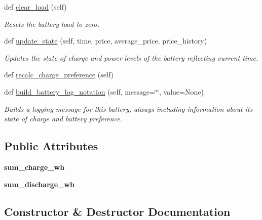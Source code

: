 \begin{DoxyCompactItemize}
def \hyperlink{class_build_1_1_objects_1_1battery_1_1_battery_a1820a5bff8f3d5d46f8d32ff73e1006c}{clear\+\_\+load} (self)
\begin{DoxyCompactList}\small\item\em Resets the battery load to zero. \end{DoxyCompactList}\item 
def \hyperlink{class_build_1_1_objects_1_1battery_1_1_battery_a246d8921279b7cb78a0f6b33f2309085}{update\+\_\+state} (self, time, price, average\+\_\+price, price\+\_\+history)
\begin{DoxyCompactList}\small\item\em Updates the state of charge and power levels of the battery reflecting current time. \end{DoxyCompactList}\item 
def \hyperlink{class_build_1_1_objects_1_1battery_1_1_battery_a2c343f81c849a4b8d6de5de9f19ebc98}{recalc\+\_\+charge\+\_\+preference} (self)
\item 
def \hyperlink{class_build_1_1_objects_1_1battery_1_1_battery_aa4838ab445d5c20f9c27752ffc911c6e}{build\+\_\+battery\+\_\+log\+\_\+notation} (self, message=\char`\"{}\char`\"{}, value=None)
\begin{DoxyCompactList}\small\item\em Builds a logging message for this battery, always including information about its state of charge and battery preference. \end{DoxyCompactList}\end{DoxyCompactItemize}
\subsection*{Public Attributes}
\begin{DoxyCompactItemize}
\item 
\mbox{\label{class_build_1_1_objects_1_1battery_1_1_battery_afa91328477ff0492e6676ad1f0f02cb3}} 
{\bfseries sum\+\_\+charge\+\_\+wh}
\item 
\mbox{\label{class_build_1_1_objects_1_1battery_1_1_battery_a29e1aeb292abeb444b5fb2ca05749c96}} 
{\bfseries sum\+\_\+discharge\+\_\+wh}
\end{DoxyCompactItemize}


\subsection{Constructor \& Destructor Documentation}
\mbox{\label{class_build_1_1_objects_1_1battery_1_1_battery_a4f033824699b9a467a337561a41f024a}} 
